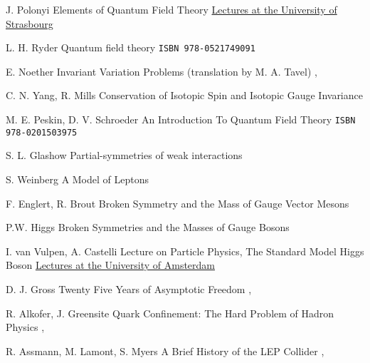 

{J. Polonyi}
{Elements of Quantum Field Theory}
{\href{http://www-physique.u-strasbg.fr/~polonyi/}{Lectures at the University of Strasbourg}}

{L. H. Ryder}
{Quantum field theory}
{\texttt{ISBN 978-0521749091}}

{E. Noether}
{Invariant Variation Problems (translation by M. A. Tavel)}
{, }

{C. N. Yang, R. Mills}
{Conservation of Isotopic Spin and Isotopic Gauge Invariance}
{}

{M. E. Peskin, D. V. Schroeder}
{An Introduction To Quantum Field Theory}
{\texttt{ISBN 978-0201503975}}

{S. L. Glashow}
{Partial-symmetries of weak interactions}
{}

{S. Weinberg}
{A Model of Leptons}
{}

{F. Englert, R. Brout}
{Broken Symmetry and the Mass of Gauge Vector Mesons}
{}

{P.W. Higgs}
{Broken Symmetries and the Masses of Gauge Bosons}
{}

{I. van Vulpen, A. Castelli}
{Lecture on Particle Physics, The Standard Model Higgs Boson}
{\href{http://www.nikhef.nl/~ivov/Ivo_teaching.html}{Lectures at the University of Amsterdam}}

{D. J. Gross}
{Twenty Five Years of Asymptotic Freedom}
{, }

{R. Alkofer, J. Greensite}
{Quark Confinement: The Hard Problem of Hadron Physics}
{, }

{R. Assmann, M. Lamont, S. Myers}
{A Brief History of the LEP Collider}
{, }

